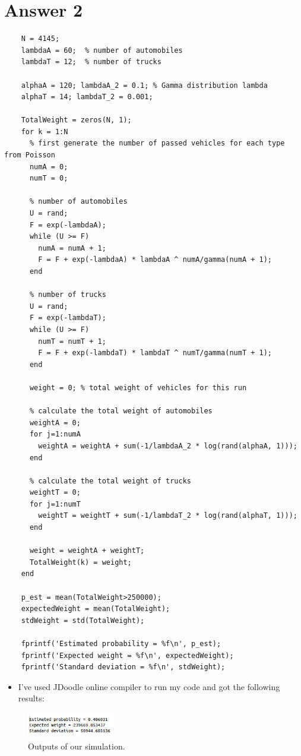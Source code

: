 \documentclass[12pt]{article}
\begin{document}
\section*{Answer 2}

\begin{verbatim}
    N = 4145;
    lambdaA = 60;  % number of automobiles
    lambdaT = 12;  % number of trucks
    
    alphaA = 120; lambdaA_2 = 0.1; % Gamma distribution lambda
    alphaT = 14; lambdaT_2 = 0.001;
    
    TotalWeight = zeros(N, 1);
    for k = 1:N
      % first generate the number of passed vehicles for each type from Poisson
      numA = 0;
      numT = 0;
    
      % number of automobiles
      U = rand;
      F = exp(-lambdaA);
      while (U >= F)
        numA = numA + 1;
        F = F + exp(-lambdaA) * lambdaA ^ numA/gamma(numA + 1);
      end
    
      % number of trucks
      U = rand;
      F = exp(-lambdaT);
      while (U >= F)
        numT = numT + 1;
        F = F + exp(-lambdaT) * lambdaT ^ numT/gamma(numT + 1);
      end
    
      weight = 0; % total weight of vehicles for this run
    
      % calculate the total weight of automobiles
      weightA = 0;
      for j=1:numA
        weightA = weightA + sum(-1/lambdaA_2 * log(rand(alphaA, 1)));
      end
    
      % calculate the total weight of trucks
      weightT = 0;
      for j=1:numT
        weightT = weightT + sum(-1/lambdaT_2 * log(rand(alphaT, 1)));
      end
    
      weight = weightA + weightT;
      TotalWeight(k) = weight;
    end
    
    p_est = mean(TotalWeight>250000);
    expectedWeight = mean(TotalWeight);
    stdWeight = std(TotalWeight);
    
    fprintf('Estimated probability = %f\n', p_est);
    fprintf('Expected weight = %f\n', expectedWeight);
    fprintf('Standard deviation = %f\n', stdWeight);
    \end{verbatim}
\begin{itemize}
    \item I've used JDoodle online compiler to run my code and got the following results:
\end{itemize}
\begin{figure}[H]
    \centering
    \includegraphics[width=0.35\textwidth]{code_and_output/image.png}
    \caption{Outputs of our simulation.}
    \label{fig:example_b}
\end{figure}
\end{document}
